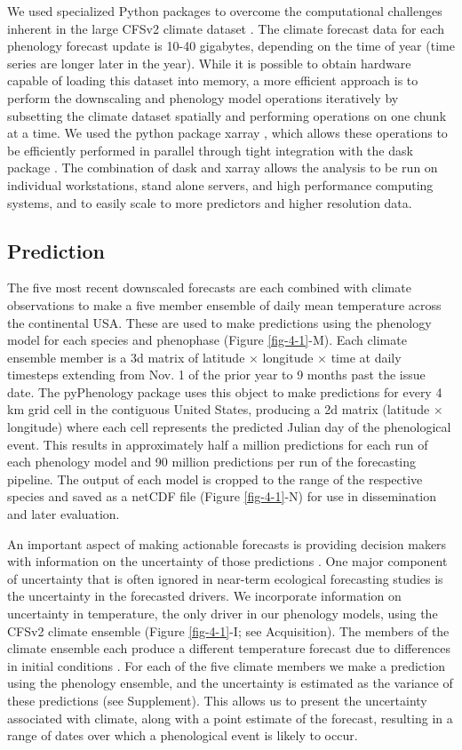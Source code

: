 We used specialized Python packages to overcome the computational challenges inherent in the large CFSv2 climate dataset \citep{python}. The climate forecast data for each phenology forecast update is 10-40 gigabytes, depending on the time of year (time series are longer later in the year). While it is possible to obtain hardware capable of loading this dataset into memory, a more efficient approach is to perform the downscaling and phenology model operations iteratively by subsetting the climate dataset spatially and performing operations on one chunk at a time. We used the python package xarray \citep{xarray}, which allows these operations to be efficiently performed in parallel through tight integration with the dask package \citep{dask}. The combination of dask and xarray allows the analysis to be run on individual workstations, stand alone servers, and high performance computing systems, and to easily scale to more predictors and higher resolution data.

\subsection{Prediction}

The five most recent downscaled forecasts are each combined with climate observations to make a five member ensemble of daily mean temperature across the continental USA. These are used to make predictions using the phenology model for each species and phenophase (Figure \ref{fig-4-1}-M). Each climate ensemble member is a 3d matrix of latitude $\times$ longitude $\times$ time at daily timesteps extending from Nov. 1 of the prior year to 9 months past the issue date. The pyPhenology package uses this object to make predictions for every 4 km grid cell in the contiguous United States, producing a 2d matrix (latitude $\times$ longitude) where each cell represents the predicted Julian day of the phenological event. This results in approximately half a million predictions for each run of each phenology model and 90 million predictions per run of the forecasting pipeline. The output of each model is cropped to the range of the respective species \citep{little1999} and saved as a netCDF file (Figure \ref{fig-4-1}-N) for use in dissemination and later evaluation. 

An important aspect of making actionable forecasts is providing decision makers with information on the uncertainty of those predictions \citep{dietze2018}. One major component of uncertainty that is often ignored in near-term ecological forecasting studies is the uncertainty in the forecasted drivers. We incorporate information on uncertainty in temperature, the only driver in our phenology models, using the CFSv2 climate ensemble (Figure \ref{fig-4-1}-I; see Acquisition). The members of the climate ensemble each produce a different temperature forecast due to differences in initial conditions \citep{weisheimer2014}. For each of the five climate members we make a prediction using the phenology ensemble, and the uncertainty is estimated as the variance of these predictions (see Supplement). This allows us to present the uncertainty associated with climate, along with a point estimate of the forecast, resulting in a range of dates over which a phenological event is likely to occur.

